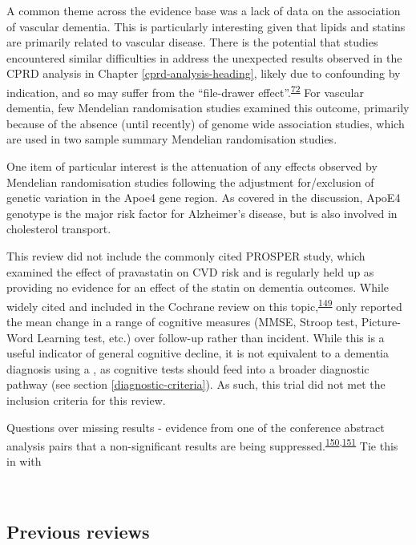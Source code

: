 \documentclass[a4paper, twoside]{templates/ociamthesis}
\begin{document}
A common theme across the evidence base was a lack of data on the association of vascular dementia. This is particularly interesting given that lipids and statins are primarily related to vascular disease. There is the potential that studies encountered similar difficulties in address the unexpected results observed in the CPRD analysis in Chapter \ref{cprd-analysis-heading}, likely due to confounding by indication, and so may suffer from the ``file-drawer effect''.\textsuperscript{\protect\hyperlink{ref-rosenthal1979}{72}} For vascular dementia, few Mendelian randomisation studies examined this outcome, primarily because of the absence (until recently) of genome wide association studies, which are used in two sample summary Mendelian randomisation studies.

One item of particular interest is the attenuation of any effects observed by Mendelian randomisation studies following the adjustment for/exclusion of genetic variation in the Apoe4 gene region. As covered in the discussion, ApoE4 genotype is the major risk factor for Alzheimer's disease, but is also involved in cholesterol transport.

This review did not include the commonly cited PROSPER study, which examined the effect of pravastatin on CVD risk and is regularly held up as providing no evidence for an effect of the statin on dementia outcomes. While widely cited and included in the Cochrane review on this topic,\textsuperscript{\protect\hyperlink{ref-mcguinness2016}{149}} only reported the mean change in a range of cognitive measures (MMSE, Stroop test, Picture-Word Learning test, etc.) over follow-up rather than incident. While this is a useful indicator of general cognitive decline, it is not equivalent to a dementia diagnosis using a , as cognitive tests should feed into a broader diagnostic pathway (see section \ref{diagnostic-criteria}). As such, this trial did not met the inclusion criteria for this review.

Questions over missing results - evidence from one of the conference abstract analysis pairs that a non-significant results are being suppressed.\textsuperscript{\protect\hyperlink{ref-yamada2009}{150},\protect\hyperlink{ref-yamada2009a}{151}} Tie this in with

~

\hypertarget{rev-previous-reviews}{%
\subsection{Previous reviews}\label{rev-previous-reviews}}
\end{document}
